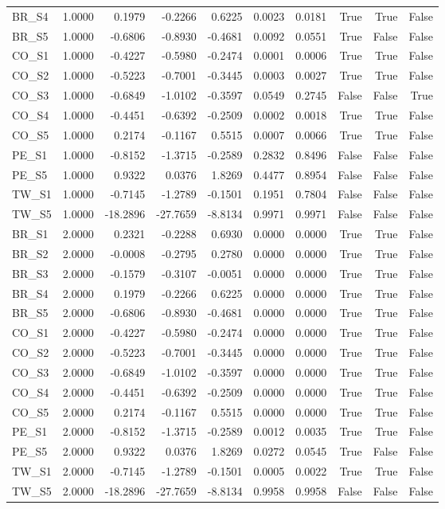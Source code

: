 \begin{tabular}{lrrrrrrrrr}
BR\_S4 & 1.0000 & 0.1979 & -0.2266 & 0.6225 & 0.0023 & 0.0181 & True & True & False \\
BR\_S5 & 1.0000 & -0.6806 & -0.8930 & -0.4681 & 0.0092 & 0.0551 & True & False & False \\
CO\_S1 & 1.0000 & -0.4227 & -0.5980 & -0.2474 & 0.0001 & 0.0006 & True & True & False \\
CO\_S2 & 1.0000 & -0.5223 & -0.7001 & -0.3445 & 0.0003 & 0.0027 & True & True & False \\
CO\_S3 & 1.0000 & -0.6849 & -1.0102 & -0.3597 & 0.0549 & 0.2745 & False & False & True \\
CO\_S4 & 1.0000 & -0.4451 & -0.6392 & -0.2509 & 0.0002 & 0.0018 & True & True & False \\
CO\_S5 & 1.0000 & 0.2174 & -0.1167 & 0.5515 & 0.0007 & 0.0066 & True & True & False \\
PE\_S1 & 1.0000 & -0.8152 & -1.3715 & -0.2589 & 0.2832 & 0.8496 & False & False & False \\
PE\_S5 & 1.0000 & 0.9322 & 0.0376 & 1.8269 & 0.4477 & 0.8954 & False & False & False \\
TW\_S1 & 1.0000 & -0.7145 & -1.2789 & -0.1501 & 0.1951 & 0.7804 & False & False & False \\
TW\_S5 & 1.0000 & -18.2896 & -27.7659 & -8.8134 & 0.9971 & 0.9971 & False & False & False \\
BR\_S1 & 2.0000 & 0.2321 & -0.2288 & 0.6930 & 0.0000 & 0.0000 & True & True & False \\
BR\_S2 & 2.0000 & -0.0008 & -0.2795 & 0.2780 & 0.0000 & 0.0000 & True & True & False \\
BR\_S3 & 2.0000 & -0.1579 & -0.3107 & -0.0051 & 0.0000 & 0.0000 & True & True & False \\
BR\_S4 & 2.0000 & 0.1979 & -0.2266 & 0.6225 & 0.0000 & 0.0000 & True & True & False \\
BR\_S5 & 2.0000 & -0.6806 & -0.8930 & -0.4681 & 0.0000 & 0.0000 & True & True & False \\
CO\_S1 & 2.0000 & -0.4227 & -0.5980 & -0.2474 & 0.0000 & 0.0000 & True & True & False \\
CO\_S2 & 2.0000 & -0.5223 & -0.7001 & -0.3445 & 0.0000 & 0.0000 & True & True & False \\
CO\_S3 & 2.0000 & -0.6849 & -1.0102 & -0.3597 & 0.0000 & 0.0000 & True & True & False \\
CO\_S4 & 2.0000 & -0.4451 & -0.6392 & -0.2509 & 0.0000 & 0.0000 & True & True & False \\
CO\_S5 & 2.0000 & 0.2174 & -0.1167 & 0.5515 & 0.0000 & 0.0000 & True & True & False \\
PE\_S1 & 2.0000 & -0.8152 & -1.3715 & -0.2589 & 0.0012 & 0.0035 & True & True & False \\
PE\_S5 & 2.0000 & 0.9322 & 0.0376 & 1.8269 & 0.0272 & 0.0545 & True & False & False \\
TW\_S1 & 2.0000 & -0.7145 & -1.2789 & -0.1501 & 0.0005 & 0.0022 & True & True & False \\
TW\_S5 & 2.0000 & -18.2896 & -27.7659 & -8.8134 & 0.9958 & 0.9958 & False & False & False \\
\bottomrule
\end{tabular}
